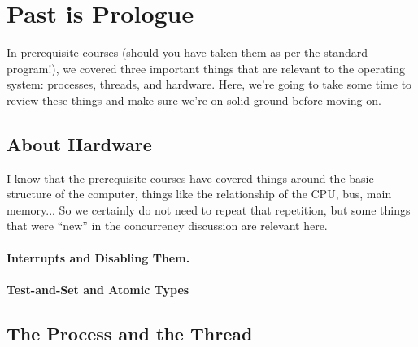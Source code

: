 




\section*{Past is Prologue}
In prerequisite courses (should you have taken them as per the standard program!), we covered three important things that are relevant to the operating system: processes, threads, and hardware. Here, we're going to take some time to review these things and make sure we're on solid ground before moving on. 


\subsection*{About Hardware}
I know that the prerequisite courses have covered things around the basic structure of the computer, things like the relationship of the CPU, bus, main memory... So we certainly do not need to repeat that repetition, but some things that were ``new'' in the concurrency discussion are relevant here.

\paragraph{Interrupts and Disabling Them.}


\paragraph{Test-and-Set and Atomic Types}

\subsection*{The Process and the Thread}






